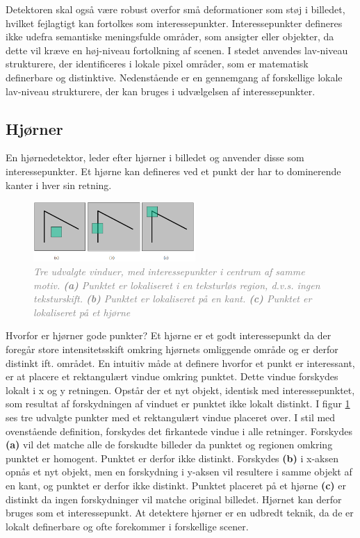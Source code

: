 Detektoren skal også være robust overfor små deformationer som støj i billedet, hvilket fejlagtigt kan fortolkes som interessepunkter. Interessepunkter defineres ikke udefra semantiske meningsfulde områder, som ansigter eller objekter, da dette vil kræve en høj-niveau fortolkning af scenen. I stedet anvendes lav-niveau strukturere, der identificeres i lokale pixel områder, som er matematisk definerbare og distinktive. Nedenstående er en gennemgang af forskellige lokale lav-niveau strukturere, der kan bruges i udvælgelsen af interessepunkter.
 \subsection{Hjørner}\label{subsec:corner}
En hjørnedetektor, leder efter hjørner i billedet og anvender disse som interessepunkter. Et hjørne kan defineres ved et punkt der har to dominerende kanter i hver sin retning.
\begin{figure}[H]
    \centering
    \includegraphics[width=0.55\textwidth]{fig/6.png}
    \vspace{-1em}   
    \begin{center}    
    \caption{\textcolor{gray}{\footnotesize \textit{
     Tre udvalgte vinduer, med interessepunkter i centrum af samme motiv. \textbf{(a)} Punktet er lokaliseret i en teksturløs region, d.v.s. ingen teksturskift. \textbf{(b)} Punktet er lokaliseret på en kant. \textbf{(c)} Punktet er lokaliseret på et hjørne }}}
    \label{fig:2}
     \end{center}
    \vspace{-2.7em}  
  \end{figure}  
\noindent
Hvorfor er hjørner gode punkter? Et hjørne er et godt interessepunkt da der foregår store intensitetsskift omkring hjørnets omliggende område og er derfor distinkt ift. området.
En intuitiv måde at definere hvorfor et punkt er interessant, er at placere et rektangulært vindue omkring punktet. Dette vindue forskydes lokalt i x og y retningen. Opstår der et nyt objekt, identisk med interessepunktet, som resultat af forskydningen af vinduet er punktet ikke lokalt distinkt. I figur \ref{fig:2} ses tre udvalgte punkter med et rektangulært vindue placeret over. I stil med ovenstående definition, forskydes det firkantede vindue i alle retninger. Forskydes \textbf{(a)} vil det matche alle de forskudte billeder da punktet og regionen omkring punktet er homogent. Punktet er derfor ikke distinkt. Forskydes \textbf{(b)} i x-aksen opnås et nyt objekt, men en forskydning i y-aksen vil resultere i samme objekt af en kant, og punktet er derfor ikke distinkt. Punktet placeret på et hjørne \textbf{(c)} er distinkt da ingen forskydninger vil matche original billedet. Hjørnet kan derfor bruges som et interessepunkt. At detektere hjørner er en udbredt teknik, da de er lokalt definerbare og ofte forekommer i forskellige scener.
